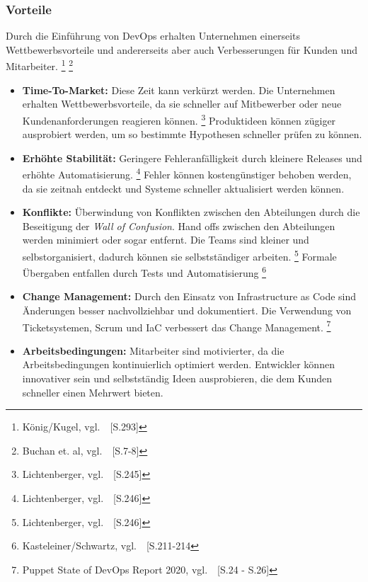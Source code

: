 \subsubsection{Vorteile}\label{devops_vorteile}

Durch die Einführung von DevOps erhalten Unternehmen einerseits Wettbewerbsvorteile und andererseits aber auch Verbesserungen für Kunden und Mitarbeiter.
\footnote{König/Kugel, vgl.~\cite{Konig2019}~[S.293]}
\footnote{Buchan et. al, vgl.~\cite{Senapathi2018}~[S.7-8]}

\begin{itemize}
    \item \textbf{Time-To-Market:}
    Diese Zeit kann verkürzt werden.
    Die Unternehmen erhalten Wettbewerbsvorteile, da sie schneller auf Mitbewerber oder neue Kundenanforderungen reagieren können. \footnote{Lichtenberger, vgl.~\cite{Lichtenberger2017}~[S.245]}
    Produktideen können zügiger ausprobiert werden, um so bestimmte Hypothesen schneller prüfen zu können.

    \item \textbf{Erhöhte Stabilität:}
    Geringere Fehleranfälligkeit durch kleinere Releases und erhöhte Automatisierung. \footnote{Lichtenberger, vgl.~\cite{Lichtenberger2017}~[S.246]}
    Fehler können kostengünstiger behoben werden, da sie zeitnah entdeckt und Systeme schneller aktualisiert werden können.

    \item \textbf{Konflikte:}
    Überwindung von Konflikten zwischen den Abteilungen durch die Beseitigung der \textsl{Wall of Confusion}.
    Hand offs zwischen den Abteilungen werden minimiert oder sogar entfernt.
    Die Teams sind kleiner und selbstorganisiert, dadurch können sie selbstständiger arbeiten. \footnote{Lichtenberger, vgl.~\cite{Lichtenberger2017}~[S.246]}
    Formale Übergaben entfallen durch Tests und Automatisierung \footnote{Kasteleiner/Schwartz, vgl.~\cite{Kasteleiner2019}~[S.211-214}

    \item \textbf{Change Management:}
    Durch den Einsatz von Infrastructure as Code sind Änderungen besser nachvollziehbar und dokumentiert.
    Die Verwendung von Ticketsystemen, Scrum und IaC verbessert das Change Management. \footnote{Puppet State of DevOps Report 2020, vgl.~\cite{PUPPET}~[S.24 - S.26]}

    \item \textbf{Arbeitsbedingungen:}
    Mitarbeiter sind motivierter, da die Arbeitsbedingungen kontinuierlich optimiert werden.
    Entwickler können innovativer sein und selbstständig Ideen ausprobieren, die dem Kunden schneller einen Mehrwert bieten.
\end{itemize}


